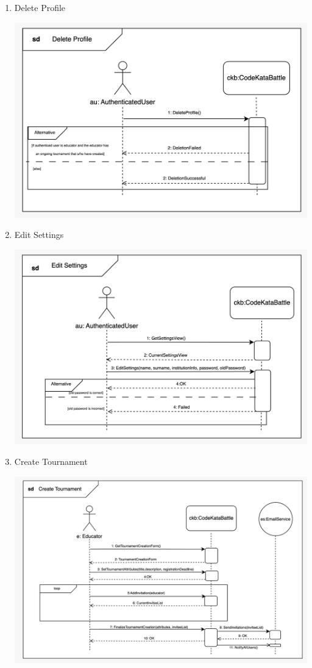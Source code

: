 \begin{enumerate}
\begin{center}
    \end{center}
    \item Delete Profile
    \begin{center}
            \includegraphics[scale=0.2]{Images/sequence_diagrams/SD-delete_profile.jpeg}
    \end{center}
    \item Edit Settings
    \begin{center}
            \includegraphics[scale=0.2]{Images/sequence_diagrams/SD-edit_settings.jpeg}
    \end{center}
    \item Create Tournament
    \begin{center}
            \includegraphics[scale=0.2]{Images/sequence_diagrams/SD-create_tournament.jpeg}

\end{center}
\end{enumerate}
